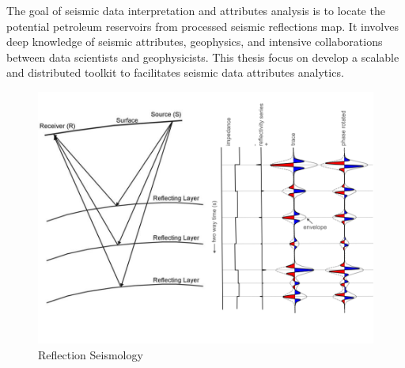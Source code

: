The goal of seismic data interpretation and  attributes analysis is to locate the potential petroleum reservoirs from processed seismic reflections map. It involves deep knowledge of seismic attributes, geophysics, and intensive collaborations between data scientists and geophysicists. This thesis focus on develop a scalable and distributed toolkit to facilitates seismic data attributes analytics.   

\begin{figure}[h]
\centering
\includegraphics[scale=0.4]{figures/seismic_reflection_principal.png}
\caption{Reflection Seismology \cite{seisreflectionepa} \cite{seisreflectionagile}}
\label{seismic_reflection}
\end{figure}




